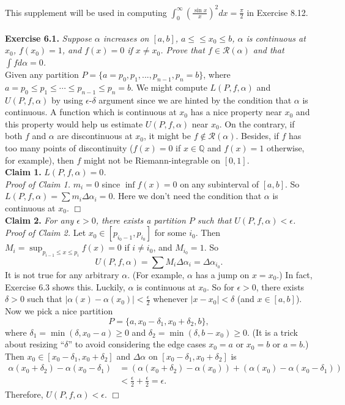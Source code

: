 \documentclass{article}
\begin{document}
This supplement will be used in computing
$\int_0^{\infty} (\frac{\sin x}{x})^2 dx = \frac{\pi}{2}$ in Exercise 8.12. \\\\


\textbf{Exercise 6.1.}
\emph{Suppose $\alpha$ increases on $[a, b]$, $a \leq ≤ x_0 \leq b$,
$\alpha$ is continuous at $x_0$, $f(x_0) = 1$, and $f(x) = 0$ if $x \neq x_0$.
Prove that $f \in \mathscr{R}(\alpha)$ and that $\int f d \alpha = 0$.} \\

Given any partition $P = \{a = p_0, p_1, ..., p_{n-1}, p_n = b \}$,
where $a = p_0 \leq p_1 \leq \cdots \leq p_{n-1} \leq p_n = b$.
We might compute $L(P, f, \alpha)$ and $U(P, f, \alpha)$ by using $\epsilon$-$\delta$ argument
since we are hinted by the condition that $\alpha$ is continuous.
A function which is continuous at $x_0$ has a nice property near $x_0$
and this property would help us estimate $U(P, f, \alpha)$ near $x_0$.
On the contrary, if both $f$ and $\alpha$ are discontinuous at $x_0$,
it might be $f \not\in \mathscr{R}(\alpha)$.
Besides, if $f$ has too many points of discontinuity
($f(x) = 0$ if $x \in \mathbb{Q}$ and $f(x) = 1$ otherwise, for example),
then $f$ might not be Riemann-integrable on $[0, 1]$. \\

\textbf{Claim 1.}
\emph{$L(P, f, \alpha) = 0$.} \\
\emph{Proof of Claim 1.}
$m_i = 0$ since $\inf f(x) = 0$ on any subinterval of $[a, b]$.
So $L(P, f, \alpha) = \sum m_i \Delta \alpha_i = 0$.
Here we don't need the condition that $\alpha$ is continuous at $x_0$.
$\Box$ \\

\textbf{Claim 2.}
\emph{For any $\epsilon > 0$,
there exists a partition $P$ such that $U(P, f, \alpha) < \epsilon$.} \\
\emph{Proof of Claim 2.}
Let $x_0 \in [p_{i_0 - 1}, p_{i_0}]$ for some $i_0$. Then
$M_i = \sup_{p_{i - 1} \leq x \leq p_i} f(x) = 0$ if $i \neq i_0$, and $M_{i_0} = 1$.
So
$$U(P, f, \alpha) = \sum M_i \Delta \alpha_i = \Delta \alpha_{i_0}.$$
It is not true for any arbitrary $\alpha$. (For example, $\alpha$ has a jump on $x = x_0$.)
In fact, Exercise 6.3 shows this.
Luckily, $\alpha$ is continuous at $x_0$. So for $\epsilon > 0$,
there exists $\delta > 0$ such that $|\alpha(x) - \alpha(x_0)| < \frac{\epsilon}{2}$
whenever $|x - x_0| < \delta$ (and $x \in [a, b]$).
Now we pick a nice partition
$$P = \{ a, x_0 - \delta_1, x_0 + \delta_2, b \},$$
where $\delta_1 = \min(\delta, x_0 - a) \geq 0$
and $\delta_2 = \min(\delta, b - x_0) \geq 0$.
(It is a trick about resizing ``$\delta$''
to avoid considering the edge cases $x_0 = a$ or $x_0 = b$ or $a = b$.)
Then $x_0 \in [x_0 - \delta_1, x_0 + \delta_2]$
and $\Delta \alpha$ on $[x_0 - \delta_1, x_0 + \delta_2]$ is
\begin{align*}
\alpha(x_0 + \delta_2) - \alpha(x_0 - \delta_1)
&= (\alpha(x_0 + \delta_2) - \alpha(x_0)) + (\alpha(x_0) - \alpha(x_0 - \delta_1)) \\
&< \frac{\epsilon}{2} + \frac{\epsilon}{2} = \epsilon.
\end{align*}
Therefore, $U(P, f, \alpha) < \epsilon$.
$\Box$ \\
\end{document}
